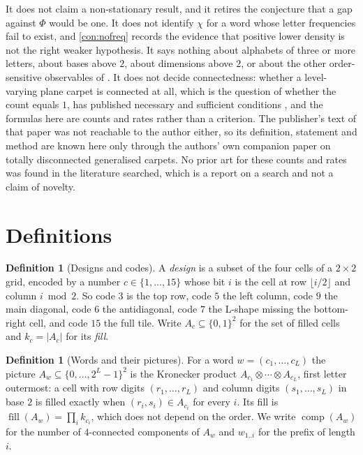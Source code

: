 \documentclass[11pt]{amsart}
\theoremstyle{definition}
\newtheorem{definition}[theorem]{Definition}
\theoremstyle{remark}
\DeclareMathOperator{\comp}{comp}
\DeclareMathOperator{\fil}{fill}
\begin{document}
It does not claim a non-stationary result, and it retires the conjecture that a gap against $\Phi$ would be one. It does not identify $\chi$ for a word whose letter frequencies fail to exist, and \cref{con:nofreq} records the evidence that positive lower density is not the right weaker hypothesis. It says nothing about alphabets of three or more letters, about bases above $2$, about dimensions above $2$, or about the other order-sensitive observables of \cite{ordersensitivity}. It does not decide connectedness: whether a level-varying plane carpet is connected at all, which is the question of whether the count equals $1$, has published necessary and sufficient conditions \cite{cristea2010}, and the formulas here are counts and rates rather than a criterion. The publisher's text of that paper was not reachable to the author either, so its definition, statement and method are known here only through the authors' own companion paper on totally disconnected generalised carpets. No prior art for these counts and rates was found in the literature searched, which is a report on a search and not a claim of novelty.

\section{Definitions}
\label{sec:defs}

\begin{definition}[Designs and codes]
\label{def:design}
A \emph{design} is a subset of the four cells of a $2 \times 2$ grid, encoded by a number $c \in \{1, \dots, 15\}$ whose bit $i$ is the cell at row $\lfloor i/2 \rfloor$ and column $i \bmod 2$. So code $3$ is the top row, code $5$ the left column, code $9$ the main diagonal, code $6$ the antidiagonal, code $7$ the L-shape missing the bottom-right cell, and code $15$ the full tile. Write $A_c \subseteq \{0,1\}^2$ for the set of filled cells and $k_c = |A_c|$ for its \emph{fill}.
\end{definition}

\begin{definition}[Words and their pictures]
\label{def:word}
For a word $w = (c_1, \dots, c_L)$ the picture $A_w \subseteq \{0, \dots, 2^L-1\}^2$ is the Kronecker product $A_{c_1} \otimes \cdots \otimes A_{c_L}$, first letter outermost: a cell with row digits $(r_1, \dots, r_L)$ and column digits $(s_1, \dots, s_L)$ in base $2$ is filled exactly when $(r_i, s_i) \in A_{c_i}$ for every $i$. Its fill is $\fil(A_w) = \prod_i k_{c_i}$, which does not depend on the order. We write $\comp(A_w)$ for the number of $4$-connected components of $A_w$ and $w_{1..i}$ for the prefix of length $i$.
\end{definition}
\end{document}

